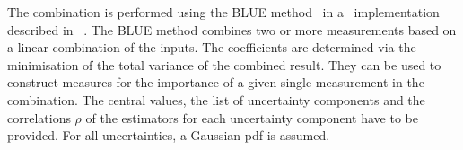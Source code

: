 %
%
The combination is performed using the \gls{BLUE} method~\cite{BLUE1,BLUERN} in a \Cpp\ implementation described in ~\cite{BLUEcpp}.
%
The \gls{BLUE} method combines two or more measurements based on a linear combination of the inputs. 
%
The coefficients are determined via the minimisation of the total variance of the combined result. They can be used to construct measures for the importance of a given single measurement in the combination. 
%
The central values, the list of uncertainty components and the correlations $\rho$ of the estimators for each uncertainty component have to be provided. 
%
For all uncertainties, a Gaussian \gls{pdf} is assumed.
%
%
